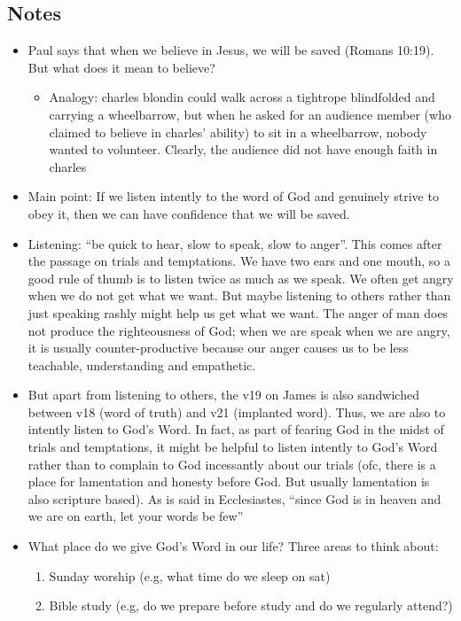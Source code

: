 \subsection*{Notes}
\begin{itemize}
  \item{Paul says that when we believe in Jesus, we will be saved (Romans 10:19). But what does it mean to believe?
  \begin{itemize}
    \item Analogy: charles blondin could walk across a tightrope blindfolded and carrying a wheelbarrow, but when he asked for an audience member (who claimed to believe in charles’ ability) to sit in a wheelbarrow, nobody wanted to volunteer. Clearly, the audience did not have enough faith in charles
  \end{itemize}}
  \item{Main point: If we listen intently to the word of God and genuinely strive to obey it, then we can have confidence that we will be saved.}
  \item{Listening: “be quick to hear, slow to speak, slow to anger”. This comes after the passage on trials and temptations. We have two ears and one mouth, so a good rule of thumb is to listen twice as much as we speak. We often get angry when we do not get what we want. But maybe listening to others rather than just speaking rashly might help us get what we want. The anger of man does not produce the righteousness of God; when we are speak when we are angry, it is usually counter-productive because our anger causes us to be less teachable, understanding and empathetic.}
  \item{But apart from listening to others, the v19 on James is also sandwiched between v18 (word of truth) and v21 (implanted word). Thus, we are also to intently listen to God’s Word. In fact, as part of fearing God in the midst of trials and temptations, it might be helpful to listen intently to God’s Word rather than to complain to God incessantly about our trials (ofc, there is a place for lamentation and honesty before God. But usually lamentation is also scripture based). As is said in Ecclesiastes, “since God is in heaven and we are on earth, let your words be few”}
  \item{What place do we give God’s Word in our life? Three areas to think about:
  \begin{enumerate}
    \item Sunday worship (e.g, what time do we sleep on sat)
    \item Bible study (e.g, do we prepare before study and do we regularly attend?)

\end{enumerate}}
\end{itemize}
